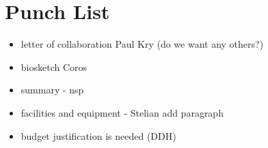 \section{Punch List}

\begin{itemize}

\item letter of collaboration Paul Kry (do we want any others?)
\item biosketch Coros
\item summary - nsp
\item facilities and equipment - Stelian add paragraph
\item budget justification is needed (DDH)

\end{itemize}
